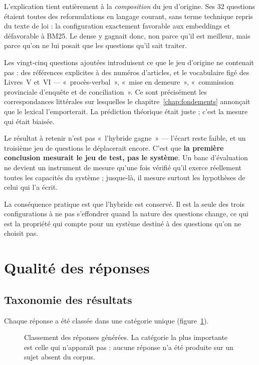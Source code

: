 L'explication tient entièrement à la \emph{composition} du jeu d'origine. Ses 32 questions étaient
toutes des reformulations en langage courant, sans terme technique repris du texte de loi : la
configuration exactement favorable aux embeddings et défavorable à BM25. Le dense y gagnait donc,
non parce qu'il est meilleur, mais parce qu'on ne lui posait que les questions qu'il sait traiter.

Les vingt-cinq questions ajoutées introduisent ce que le jeu d'origine ne contenait pas : des
références explicites à des numéros d'articles, et le vocabulaire figé des Livres~V et~VI ---
«~procès-verbal~», «~mise en demeure~», «~commission provinciale d'enquête et de conciliation~».
Ce sont précisément les correspondances littérales sur lesquelles le chapitre~\ref{chap:fondements}
annonçait que le lexical l'emporterait. La prédiction théorique était juste ; c'est la mesure qui
était biaisée.

\begin{constat}
Le résultat à retenir n'est pas «~l'hybride gagne~» --- l'écart reste faible, et un troisième jeu
de questions le déplacerait encore. C'est que \textbf{la première conclusion mesurait le jeu de
test, pas le système}. Un banc d'évaluation ne devient un instrument de mesure qu'une fois vérifié
qu'il exerce réellement toutes les capacités du système ; jusque-là, il mesure surtout les
hypothèses de celui qui l'a écrit.

\smallskip
La conséquence pratique est que l'hybride est conservé. Il est la seule des trois configurations à
ne pas s'effondrer quand la nature des questions change, ce qui est la propriété qui compte pour un
système destiné à des questions qu'on ne choisit pas.
\end{constat}

\section{Qualité des réponses}

\subsection{Taxonomie des résultats}

Chaque réponse a été classée dans une catégorie unique (figure~\ref{fig:taxonomie}).

\begin{figure}[htbp]
  \centering
  
  \caption[Classement des réponses générées]{Classement des \NbQuestions{} réponses générées. La
  catégorie la plus importante est celle qui n'apparaît pas : aucune réponse n'a été produite sur
  un sujet absent du corpus.}
  \label{fig:taxonomie}
\end{figure}

